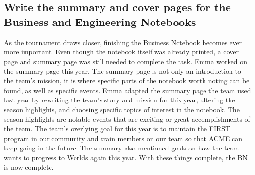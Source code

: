 \documentclass{article}
\newif\ifcontents
\begin{document}
\contentsfalse

\subsection{Write the summary and cover pages for the Business and Engineering Notebooks}
As the tournament draws closer, finishing the Business Notebook becomes ever more important. Even though the notebook itself was already printed, a cover page and summary page was still needed to complete the task. Emma worked on the summary page this year. The summary page is not only an introduction to the team's mission, it is where specific parts of the notebook worth noting can be found, as well as specific events. Emma adapted the summary page the team used last year by rewriting the team's story and mission for this year, altering the season highlights, and choosing specific topics of interest in the notebook. The season highlights are notable events that are exciting or great accomplishments of the team. The team's overlying goal for this year is to maintain the FIRST program in our community and train members on our team so that ACME can keep going in the future. The summary also mentioned goals on how the team wants to progress to Worlds again this year. With these things complete, the BN is now complete.  
\end{document}
